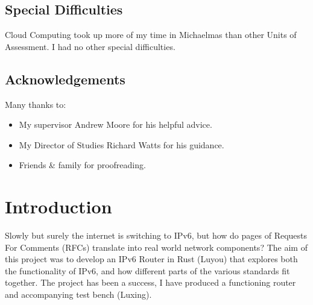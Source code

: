 \documentclass[12pt,a4paper,twoside,openany]{report}
\begin{document}
\section*{Special Difficulties}

Cloud Computing took up more of my time in Michaelmas than other Units of Assessment. I had no other special difficulties.

\tableofcontents
{}
\listoffigures
{}

\newpage
\section*{Acknowledgements}

Many thanks to:
\begin{itemize}
\item My supervisor Andrew Moore for his helpful advice.
\item My Director of Studies Richard Watts for his guidance.
\item Friends \& family for proofreading.
\end{itemize}


\pagestyle{headings}

\chapter{Introduction}
\label{chap::introduction}
Slowly but surely the internet is switching to IPv6\cite{ipv6_rfc}, but how do pages of Requests For Comments (RFCs) translate into real world network components? The aim of this project was to develop an IPv6 Router in Rust (Luyou) that explores both the functionality of IPv6, and how different parts of the various standards fit together. The project has been a success, I have produced a functioning router and accompanying test bench (Luxing).

\bigskip
\end{document}
